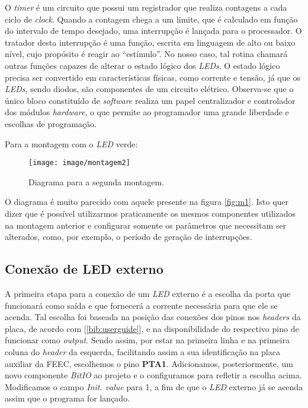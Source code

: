 \FloatBarrier

O \textit{timer} é um circuito que possui um registrador que realiza contagens
a cada ciclo de \textit{clock}. Quando a contagem chega a um limite, que é
calculado em função do intervalo de tempo desejado, uma interrupção é lançada
para o processador. O tratador desta interrupção é uma função, escrita em
linguagem de alto ou baixo nível, cujo propósito é reagir ao ``estímulo''. No
nosso caso, tal rotina chamará outras funções capazes de alterar o estado lógico
dos \textit{LEDs}. O estado lógico precisa ser convertido em características
físicas, como corrente e tensão, já que os \textit{LEDs}, sendo diodos, são
componentes de um circuito elétrico. Observa-se que o único bloco constituído de
\textit{software} realiza um papel centralizador e controlador dos módulos
\textit{hardware}, o que permite ao programador uma grande liberdade e escolhas
de programação.

\vspace{12pt}

Para a montagem com o \textit{LED} verde:

\FloatBarrier

\begin{figure}[h]
    \centering
    \texttt{[image: image/montagem2]}
    
    \caption{Diagrama para a segunda montagem.}
    \label{fig:m2}
\end{figure} 

\FloatBarrier

O diagrama é muito parecido com aquele presente na figura \ref{fig:m1}. Isto
quer dizer que é possível utilizarmos praticamente os mesmos componentes
utilizados na montagem anterior e configurar somente os parâmetros que
necessitam ser alterados, como, por exemplo, o período de geração de
interrupções.

\subsection{Conexão de LED externo}

A primeira etapa para a conexão de um \textit{LED} externo é a escolha da porta
que funcionará como saída e que fornecerá a corrente necessária para que ele se
acenda. Tal escolha foi baseada na posição das conexões dos pinos nos
\textit{headers} da placa, de acordo com [\ref{bib:userguide}], e na
disponibilidade  do respectivo pino de funcionar como \textit{output}. Sendo
assim, por estar na primeira linha e na primeira coluna do \textit{header} da
esquerda, facilitando assim a sua identificação na placa auxiliar da FEEC,
escolhemos o pino \textbf{PTA1}. Adicionamos, posteriormente, um novo componente
\textit{BitIO} ao projeto e o configuramos para refletir a escolha acima.
Modificamos o campo \textit{Init. value} para 1, a fim de que o \textit{LED}
externo já se acenda assim que o programa for lançado.

